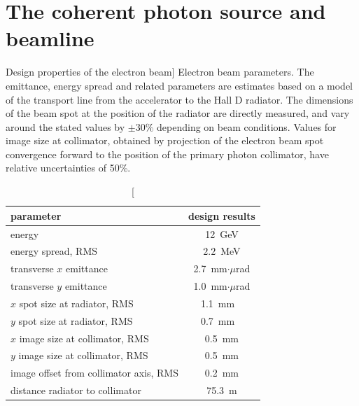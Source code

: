 \section[The coherent photon source and beamline]{The coherent photon source and beamline \label{sec:beamline}}

\begin{table}[tbp]
\begin{center}
\caption
[Design properties of the electron beam]
{Electron beam parameters. 
The emittance, energy spread and       
related parameters are estimates
based on a model of the transport line from
the accelerator to the Hall D radiator.
The dimensions of the beam spot at the position of 
the radiator are directly measured, and vary around the
stated values by $\pm 30\%$
depending on beam conditions. 
Values for image size at collimator,
obtained by projection of the electron beam
spot convergence forward to the position of
the primary photon collimator, have relative
uncertainties of 50\%.
\label{tab:elecprop}}  
\begin{tabular}{|l|c|}
\hline\hline
parameter & design results \\
\hline
energy & 12~GeV \\ 
energy spread, RMS & $2.2$~MeV \\
transverse $x$ emittance & 2.7~mm$\cdot\mu$rad \\
transverse $y$ emittance & 1.0~mm$\cdot\mu$rad \\
$x$ spot size at radiator, RMS & 1.1~mm \ \\
$y$ spot size at radiator, RMS & 0.7~mm \ \\
$x$ image size at collimator, RMS & 0.5~mm \\
$y$ image size at collimator, RMS & 0.5~mm \\
image offset from collimator axis, RMS & 0.2~mm \\
distance radiator to collimator & 75.3~m \\
\hline\hline
\end{tabular}
\end{center}
\end{table}

